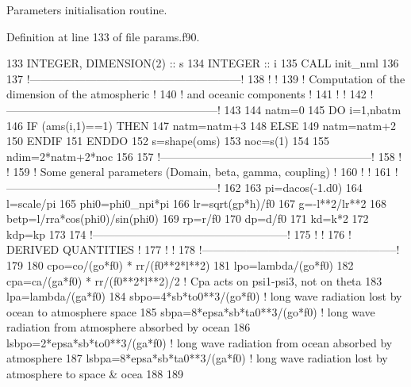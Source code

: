 Parameters initialisation routine. 



Definition at line 133 of file params.\+f90.


\begin{DoxyCode}
133     \textcolor{keywordtype}{INTEGER}, \textcolor{keywordtype}{DIMENSION(2)} :: s
134     \textcolor{keywordtype}{INTEGER} :: i
135     \textcolor{keyword}{CALL }init\_nml
136 
137     \textcolor{comment}{!---------------------------------------------------------!}
138     \textcolor{comment}{!                                                         !}
139     \textcolor{comment}{! Computation of the dimension of the atmospheric         !}
140     \textcolor{comment}{! and oceanic components                                  !}
141     \textcolor{comment}{!                                                         !}
142     \textcolor{comment}{!---------------------------------------------------------!}
143 
144     natm=0
145     \textcolor{keywordflow}{DO} i=1,nbatm
146        \textcolor{keywordflow}{IF} (ams(i,1)==1) \textcolor{keywordflow}{THEN}
147           natm=natm+3
148        \textcolor{keywordflow}{ELSE}
149           natm=natm+2
150 \textcolor{keywordflow}{       ENDIF}
151 \textcolor{keywordflow}{    ENDDO}
152     s=shape(oms)
153     noc=s(1)
154 
155     ndim=2*natm+2*noc
156 
157     \textcolor{comment}{!---------------------------------------------------------!}
158     \textcolor{comment}{!                                                         !}
159     \textcolor{comment}{! Some general parameters (Domain, beta, gamma, coupling) !}
160     \textcolor{comment}{!                                                         !}
161     \textcolor{comment}{!---------------------------------------------------------!}
162 
163     pi=dacos(-1.d0)
164     l=scale/pi
165     phi0=phi0\_npi*pi
166     lr=sqrt(gp*h)/f0
167     g=-l**2/lr**2
168     betp=l/rra*cos(phi0)/sin(phi0)
169     rp=r/f0
170     dp=d/f0
171     kd=k*2
172     kdp=kp
173 
174     \textcolor{comment}{!-----------------------------------------------------!}
175     \textcolor{comment}{!                                                     !}
176     \textcolor{comment}{! DERIVED QUANTITIES                                  !}
177     \textcolor{comment}{!                                                     !}
178     \textcolor{comment}{!-----------------------------------------------------!}
179 
180     cpo=co/(go*f0) * rr/(f0**2*l**2)
181     lpo=lambda/(go*f0)
182     cpa=ca/(ga*f0) * rr/(f0**2*l**2)/2 \textcolor{comment}{! Cpa acts on psi1-psi3, not on theta}
183     lpa=lambda/(ga*f0)
184     sbpo=4*sb*to0**3/(go*f0) \textcolor{comment}{! long wave radiation lost by ocean to atmosphere space}
185     sbpa=8*epsa*sb*ta0**3/(go*f0) \textcolor{comment}{! long wave radiation from atmosphere absorbed by ocean}
186     lsbpo=2*epsa*sb*to0**3/(ga*f0) \textcolor{comment}{! long wave radiation from ocean absorbed by atmosphere}
187     lsbpa=8*epsa*sb*ta0**3/(ga*f0) \textcolor{comment}{! long wave radiation lost by atmosphere to space & ocea}
188 
189 
\end{DoxyCode}


